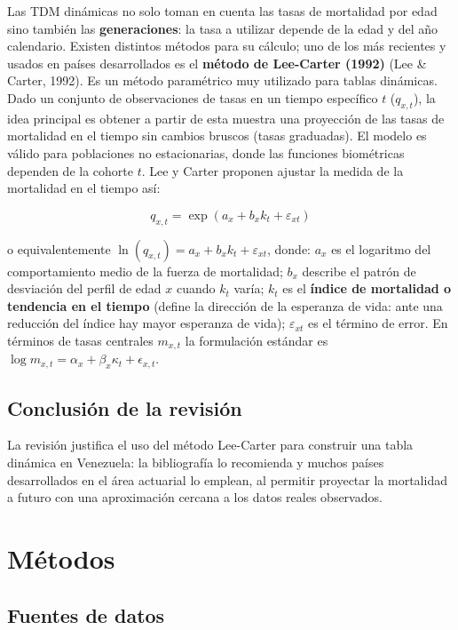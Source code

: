 \documentclass[
  11pt,
  a4paper,
]{article}
\begin{document}
Las TDM dinámicas no solo toman en cuenta las tasas de mortalidad por
edad sino también las \textbf{generaciones}: la tasa a utilizar depende
de la edad y del año calendario. Existen distintos métodos para su
cálculo; uno de los más recientes y usados en países desarrollados es el
\textbf{método de Lee-Carter (1992)} (Lee \& Carter, 1992). Es un método
paramétrico muy utilizado para tablas dinámicas. Dado un conjunto de
observaciones de tasas en un tiempo específico \(t\) (\(q_{x,t}\)), la
idea principal es obtener a partir de esta muestra una proyección de las
tasas de mortalidad en el tiempo sin cambios bruscos (tasas graduadas).
El modelo es válido para poblaciones no estacionarias, donde las
funciones biométricas dependen de la cohorte \(t\). Lee y Carter
proponen ajustar la medida de la mortalidad en el tiempo así:

\[q_{x,t} = \exp(a_x + b_x k_t + \varepsilon_{xt})\]

o equivalentemente \(\ln(q_{x,t}) = a_x + b_x k_t + \varepsilon_{xt}\),
donde: \(a_x\) es el logaritmo del comportamiento medio de la fuerza de
mortalidad; \(b_x\) describe el patrón de desviación del perfil de edad
\(x\) cuando \(k_t\) varía; \(k_t\) es el \textbf{índice de mortalidad o
tendencia en el tiempo} (define la dirección de la esperanza de vida:
ante una reducción del índice hay mayor esperanza de vida);
\(\varepsilon_{xt}\) es el término de error. En términos de tasas
centrales \(m_{x,t}\) la formulación estándar es
\(\log m_{x,t} = \alpha_x + \beta_x \kappa_t + \epsilon_{x,t}\).

\subsection{Conclusión de la
revisión}\label{conclusiuxf3n-de-la-revisiuxf3n}

La revisión justifica el uso del método Lee-Carter para construir una
tabla dinámica en Venezuela: la bibliografía lo recomienda y muchos
países desarrollados en el área actuarial lo emplean, al permitir
proyectar la mortalidad a futuro con una aproximación cercana a los
datos reales observados.

\section{Métodos}\label{muxe9todos}

\subsection{Fuentes de datos}\label{fuentes-de-datos}
\end{document}
